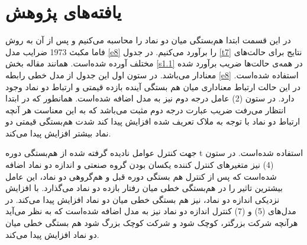 \documentclass[12pt]{article}
\begin{document}
  
     {\begin{table}[htbp]
       \centering
           \caption{خلاصه آماری پارامتر‌ها در تواتر دو هفته   }
           \label{t5}
     \end{table}} 

     \FloatBarrier
 
 
\section{یافته‌های پژوهش}
در این قسمت ابتدا 
هم‌بستگی میان دو نماد را محاسبه می‌کنیم و پس از آن به  روش فاما مکبث 1973 
ضرایب مدل 
\ref{e8}
را برآورد می‌کنیم. در جدول 
\ref{t7} 
نتایج برای حالت‌های مختلف آورده شده‌است.
 همانند مقاله بخش 
\ref{s1.1}
در همه‌ی حالت‌ها ضریب برآورد شده معنا‌دار می‌باشد. در ستون اول این جدول از مدل خطی رابطه 
\ref{e8}
استفاده شده‌است. در این حالت ارتباط معنا‌داری میان هم بستگی آینده بازده قیمتی و ارتباط دو نماد وجود دارد. در ستون (2) عامل درجه دوم نیز به مدل اضافه شده‌است. همانطور که در ابتدا انتظار می‌رفت ضریب عبارت درجه دوم مثبت می‌باشد که به این معناست هر آنچه ارتباط دو نماد با توجه به ملاک تعریف شده افزایش پیدا کند شدت هم‌بستگی قیمتی دو نماد بیشتر افزایش پیدا می‌کند.

جهت کنترل عوامل نادیده گرفته شده از هم‌بستگی دوره t استفاده شده‌است. در ستون (4) نیز متغیر‌های کنترل کننده یکسان بودن گروه صنعتی و اندازه دو نماد اضافه شده‌است که پس از کنترل هم بستگی دوره قبل و هم‌گروهی دو نماد، این عامل بیشترین تاثیر را در هم‌بستگی خطی میان رفتار بازده دو نماد می‌گذارد. با افزایش نزدیکی اندازه دو نماد، نیز هم بستگی خطی میان دو نماد افزایش پیدا می‌کند. در مدل‌های (5) و (7) کنترل اندازه دو نماد نیز به مدل اضافه شده‌است که به نظر می‌آید هرآنچه شرکت بزرگتر، کوچک شود و شرکت کوچک بزرگ شود هم بستگی خطی میان دو نماد افزایش پیدا می‌کند. 
\end{document}
